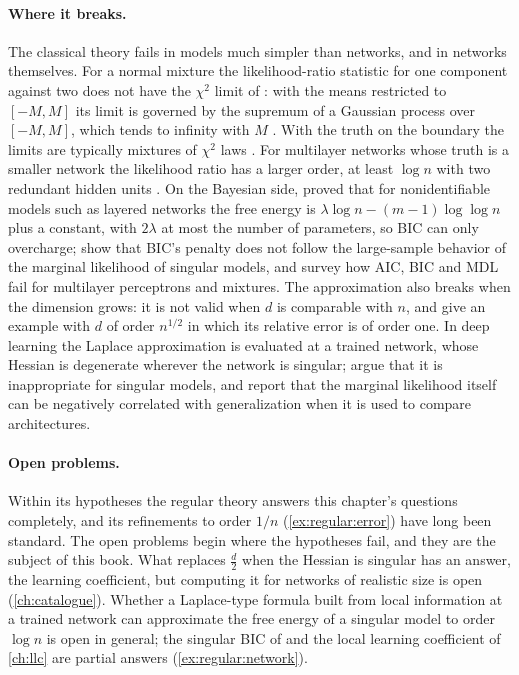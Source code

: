 \begin{refsection}
\paragraph{Where it breaks.} The classical theory fails in models much simpler than networks, and in networks themselves. For a normal mixture the likelihood-ratio statistic for one component against two does not have the $\chi^2$ limit of \textcite{Wilks1938}: with the means restricted to $[-M,M]$ its limit is governed by the supremum of a Gaussian process over $[-M,M]$, which tends to infinity with $M$ \parencite{Hartigan1985,BrazzaleMameli2024}. With the truth on the boundary the limits are typically mixtures of $\chi^2$ laws \parencite{SelfLiang1987}. For multilayer networks whose truth is a smaller network the likelihood ratio has a larger order, at least $\log n$ with two redundant hidden units \parencite{Fukumizu2003}. On the Bayesian side, \textcite{Watanabe2001a} proved that for nonidentifiable models such as layered networks the free energy is $\lambda\log n-(m-1)\log\log n$ plus a constant, with $2\lambda$ at most the number of parameters, so BIC can only overcharge; \textcite{DrtonPlummer2017} show that BIC's penalty does not follow the large-sample behavior of the marginal likelihood of singular models, and \textcite{AmariEtAl2006} survey how AIC, BIC and MDL fail for multilayer perceptrons and mixtures. The approximation also breaks when the dimension grows: it is not valid when $d$ is comparable with $n$, and \textcite{ShunMcCullagh1995} give an example with $d$ of order $n^{1/2}$ in which its relative error is of order one. In deep learning the Laplace approximation is evaluated at a trained network, whose Hessian is degenerate wherever the network is singular; \textcite{WeiEtAl2023} argue that it is inappropriate for singular models, and \textcite{LotfiEtAl2022} report that the marginal likelihood itself can be negatively correlated with generalization when it is used to compare architectures.

\paragraph{Open problems.} Within its hypotheses the regular theory answers this chapter's questions completely, and its refinements to order $1/n$ (\cref{ex:regular:error}) have long been standard. The open problems begin where the hypotheses fail, and they are the subject of this book. What replaces $\frac d2$ when the Hessian is singular has an answer, the learning coefficient, but computing it for networks of realistic size is open (\cref{ch:catalogue}). Whether a Laplace-type formula built from local information at a trained network can approximate the free energy of a singular model to order $\log n$ is open in general; the singular BIC of \textcite{DrtonPlummer2017} and the local learning coefficient of \cref{ch:llc} are partial answers (\cref{ex:regular:network}).


\end{refsection}
